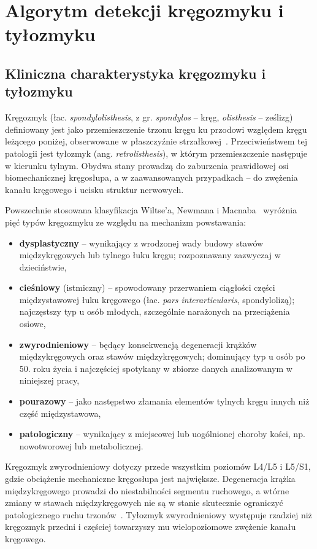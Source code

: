 \chapter{Algorytm detekcji kręgozmyku i tyłozmyku}
\label{chap:kregozmyk}

\section{Kliniczna charakterystyka kręgozmyku i tyłozmyku}

Kręgozmyk (łac. \textit{spondylolisthesis}, z gr. \textit{spondylos} -- kręg, \textit{olisthesis} -- ześlizg) definiowany jest jako przemieszczenie trzonu kręgu ku przodowi względem kręgu leżącego poniżej, obserwowane w płaszczyźnie strzałkowej~\cite{gagnet}.
Przeciwieństwem tej patologii jest tyłozmyk (ang. \textit{retrolisthesis}), w którym przemieszczenie następuje w kierunku tylnym.
Obydwa stany prowadzą do zaburzenia prawidłowej osi biomechanicznej kręgosłupa, a w zaawansowanych przypadkach -- do zwężenia kanału kręgowego i ucisku struktur nerwowych.

Powszechnie stosowana klasyfikacja Wiltse'a, Newmana i Macnaba~\cite{wiltse} wyróżnia pięć typów kręgozmyku ze względu na mechanizm powstawania:

\begin{itemize}
    \item \textbf{dysplastyczny} -- wynikający z wrodzonej wady budowy stawów międzykręgowych lub tylnego łuku kręgu; rozpoznawany zazwyczaj w dzieciństwie,
    \item \textbf{cieśniowy} (istmiczny) -- spowodowany przerwaniem ciągłości części międzystawowej łuku kręgowego (łac. \textit{pars interarticularis}, spondylolizą); najczęstszy typ u osób młodych, szczególnie narażonych na przeciążenia osiowe,
    \item \textbf{zwyrodnieniowy} -- będący konsekwencją degeneracji krążków międzykręgowych oraz stawów międzykręgowych; dominujący typ u osób po 50. roku życia i najczęściej spotykany w zbiorze danych analizowanym w niniejszej pracy,
    \item \textbf{pourazowy} -- jako następstwo złamania elementów tylnych kręgu innych niż część międzystawowa,
    \item \textbf{patologiczny} -- wynikający z miejscowej lub uogólnionej choroby kości, np. nowotworowej lub metabolicznej.
\end{itemize}

Kręgozmyk zwyrodnieniowy dotyczy przede wszystkim poziomów L4/L5 i L5/S1, gdzie obciążenie mechaniczne kręgosłupa jest największe.
Degeneracja krążka międzykręgowego prowadzi do niestabilności segmentu ruchowego, a wtórne zmiany w stawach międzykręgowych nie są w stanie skutecznie ograniczyć patologicznego ruchu trzonów~\cite{akkawi}.
Tyłozmyk zwyrodnieniowy występuje rzadziej niż kręgozmyk przedni i częściej towarzyszy mu wielopoziomowe zwężenie kanału kręgowego.

